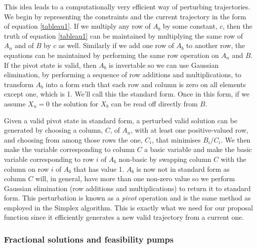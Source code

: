 This idea leads to a computationally very efficient way of perturbing trajectories. We begin by representing the constraints and the current trajectory in the form of equation \ref{tableau1}. If we multiply any row of $A_b$ by some constant, $c$, then the truth of equation \ref{tableau1} can be maintained by multiplying the same row of $A_n$ and of $B$ by $c$ as well. Similarly if we add one row of $A_b$ to another row, the equations can be maintained by performing the same row operation on $A_n$ and $B$. If the pivot state is valid, then $A_b$ is invertable so we can use Gaussian elimination, by performing a sequence of row additions and multiplications, to transform $A_b$ into a form such that each row and column is zero on all elements except one, which is 1. We'll call this the standard form. Once in this form, if we assume $X_n = 0$ the solution for $X_b$ can be read off directly from $B$.

Given a valid pivot state in standard form, a perturbed valid solution can be generated by choosing a column, $C$, of $A_n$, with at least one positive-valued row, and choosing from among those rows the one, $C_i$, that minimises $B_i/C_i$. We then make the variable corresponding to column $C$ a basic variable and make the basic variable corresponding to row $i$ of $A_b$ non-basic by swapping column $C$ with the column on row $i$ of $A_b$ that has value 1. $A_b$ is now not in standard form as column $C$ will, in general, have more than one non-zero value so we perform Gaussian elimination (row additions and multiplications) to return it to standard form. This perturbation is known as a \textit{pivot} operation and is the same method as employed in the Simplex algorithm\cite{dantzig1955generalized}\cite{vanderbei2015linear}. This is exactly what we need for our proposal function since it efficiently generates a new valid trajectory from a current one.

\subsubsection{Fractional solutions and feasibility pumps}

